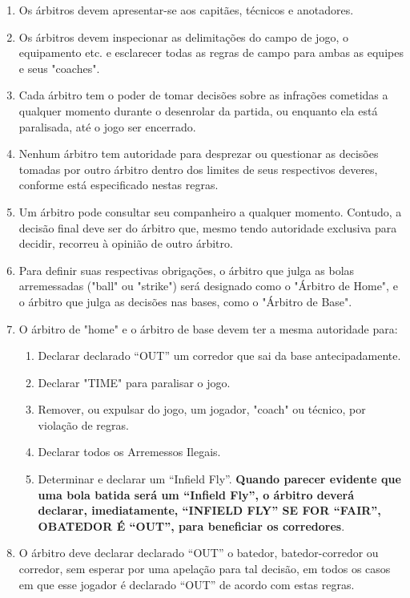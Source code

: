 \begin{multicols}{2}
\begin{enumerate}[label=\alph*)]
		\item  Os árbitros devem apresentar-se aos capitães, técnicos e anotadores.

		\item  Os árbitros devem inspecionar as delimitações do campo de jogo, o equipamento etc. e esclarecer todas as regras de campo para ambas as equipes e seus "coaches".

		\item  Cada árbitro tem o poder de tomar decisões sobre as infrações cometidas a qualquer momento durante o desenrolar da partida, ou enquanto ela está paralisada, até o jogo ser encerrado.
		\item Nenhum árbitro tem autoridade para desprezar ou questionar as decisões tomadas por outro árbitro dentro dos limites de seus respectivos deveres, conforme está especificado nestas regras.

		\item  Um árbitro pode consultar seu companheiro a qualquer momento. Contudo, a decisão final deve ser do árbitro que, mesmo tendo autoridade exclusiva para decidir, recorreu à opinião de outro árbitro.

		\item  Para definir suas respectivas obrigações, o árbitro que julga as bolas arremessadas ("ball" ou "strike") será designado como o "Árbitro de Home", e o árbitro que julga as decisões nas bases, como o "Árbitro de Base".

		\item  O árbitro de "home" e o árbitro de base devem ter a mesma autoridade para:
		\begin{enumerate}[label= \arabic*)]
			\item Declarar declarado “OUT” um corredor que sai da base antecipadamente.
			\item Declarar "TIME" para paralisar o jogo.
			\item Remover, ou expulsar do jogo, um jogador, "coach" ou técnico, por violação de regras.
			\item Declarar todos os Arremessos Ilegais.
			\item Determinar e declarar um “Infield Fly”. \textbf{Quando parecer evidente que uma bola batida será um “Infield Fly”, o árbitro deverá declarar, imediatamente, “INFIELD FLY” SE FOR “FAIR”, OBATEDOR É “OUT”, para beneficiar os corredores}.
		\end{enumerate}
		\item  O árbitro deve declarar declarado “OUT” o batedor, batedor-corredor ou corredor, sem esperar por uma apelação para tal decisão, em todos os casos em que esse jogador é declarado “OUT” de acordo com estas regras.


\end{enumerate}
\end{multicols}
